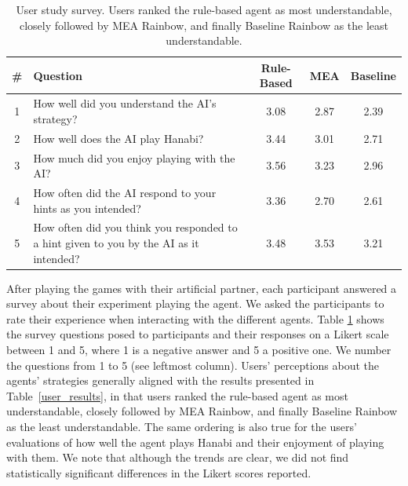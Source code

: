 \documentclass[letterpaper]{article} %
\begin{document}
\begin{table}[t]
\centering
\footnotesize
    \begin{tabular}{c p{}ccc}
 \toprule
 \# & Question & Rule-Based & MEA & Baseline \\ [0.5ex] 
 \midrule
1 & How well did you understand the AI's strategy?  & 3.08 & 2.87 & 2.39 \\
\midrule
2 & How well does the AI play Hanabi? & 3.44 & 3.01 & 2.71 \\
\midrule
3 & How much did you enjoy playing with the AI?   & 3.56 & 3.23 & 2.96 \\
 \midrule
4 & How often did the AI respond to your hints as you intended? & 3.36 & 2.70 & 2.61 \\
 \midrule
5 & How often did you think you responded to a hint given to you by the AI as it intended? & 3.48 & 3.53 & 3.21 \\ [1ex] 
 \bottomrule
\end{tabular}
\caption{User study survey.
    Users ranked the rule-based agent as most understandable, closely followed by MEA Rainbow, and finally Baseline Rainbow as the least understandable.}    
    \label{survey_table}
\end{table}

After playing the games with their artificial partner, each participant answered a survey about their experiment playing the agent. 
We asked the participants 
to rate their experience when interacting with the different agents. 
Table \ref{survey_table} shows the survey questions posed to participants and their responses on a Likert scale between 1 and 5, where 1 is a negative answer and 5 a positive one. We number the questions from 1 to 5 (see leftmost column).  Users' perceptions about the agents' strategies generally aligned with the results presented in Table~\ref{user_results}, in that  users ranked the rule-based agent as most understandable, closely followed by MEA Rainbow, and finally Baseline Rainbow as the least understandable. The same ordering is also true for the users' evaluations of how well the agent plays Hanabi and their enjoyment of playing with them. 
We note that although the trends are clear, we did not find statistically significant differences in the  Likert scores reported. %
\end{document}
